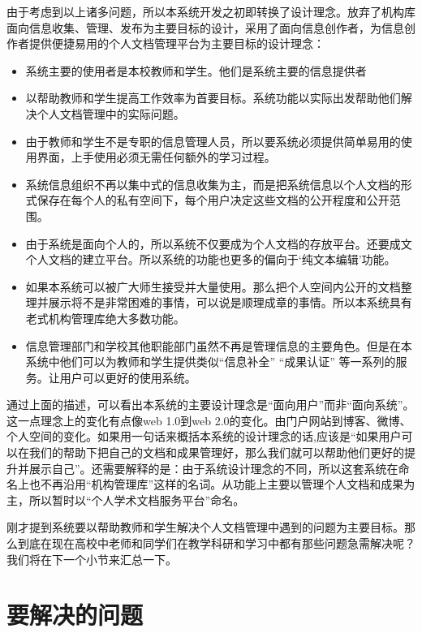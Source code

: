 由于考虑到以上诸多问题，所以本系统开发之初即转换了设计理念。放弃了机构库面向信息收集、管理、发布为主要目标的设计，采用了面向信息创作者，为信息创作者提供便捷易用的个人文档管理平台为主要目标的设计理念：
\begin{itemize}
\item 系统主要的使用者是本校教师和学生。他们是系统主要的信息提供者
\item 以帮助教师和学生提高工作效率为首要目标。系统功能以实际出发帮助他们解决个人文档管理中的实际问题。
\item 由于教师和学生不是专职的信息管理人员，所以要系统必须提供简单易用的使用界面，上手使用必须无需任何额外的学习过程。
\item 系统信息组织不再以集中式的信息收集为主，而是把系统信息以个人文档的形式保存在每个人的私有空间下，每个用户决定这些文档的公开程度和公开范围。
\item 由于系统是面向个人的，所以系统不仅要成为个人文档的存放平台。还要成文个人文档的建立平台。所以系统的功能也更多的偏向于‘纯文本编辑’功能。
\item 如果本系统可以被广大师生接受并大量使用。那么把个人空间内公开的文档整理并展示将不是非常困难的事情，可以说是顺理成章的事情。所以本系统具有老式机构管理库绝大多数功能。
\item 信息管理部门和学校其他职能部门虽然不再是管理信息的主要角色。但是在本系统中他们可以为教师和学生提供类似“信息补全” “成果认证” 等一系列的服务。让用户可以更好的使用系统。
\end{itemize}
通过上面的描述，可以看出本系统的主要设计理念是“面向用户”而非“面向系统”。这一点理念上的变化有点像web 1.0到web 2.0的变化。由门户网站到博客、微博、个人空间的变化。如果用一句话来概括本系统的设计理念的话,应该是“如果用户可以在我们的帮助下把自己的文档和成果管理好，那么我们就可以帮助他们更好的提升并展示自己”。还需要解释的是：由于系统设计理念的不同，所以这套系统在命名上也不再沿用“机构管理库”这样的名词。从功能上主要以管理个人文档和成果为主，所以暂时以“个人学术文档服务平台”命名。

刚才提到系统要以帮助教师和学生解决个人文档管理中遇到的问题为主要目标。那么到底在现在高校中老师和同学们在教学科研和学习中都有那些问题急需解决呢？我们将在下一个小节来汇总一下。

\section{要解决的问题}
\label{sec:question}

